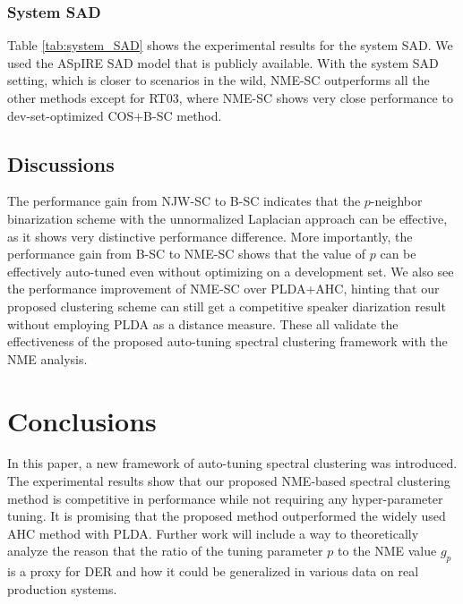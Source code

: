 \documentclass[journal]{IEEEtran}
\begin{document}
\subsubsection{System SAD} Table \ref{tab:system_SAD} shows the experimental results for the system SAD. We used the ASpIRE SAD model \cite{povey2011kaldi} that is publicly available. With the system SAD setting, which is closer to scenarios in the wild, NME-SC outperforms all the other methods except for RT03, where NME-SC shows very close performance to dev-set-optimized COS+B-SC method. 


\vspace{-1ex}
\subsection{Discussions}
The performance gain from NJW-SC to B-SC indicates that the $p$-neighbor binarization scheme with the unnormalized Laplacian approach can be effective, as it shows very distinctive performance difference. More importantly, the performance gain from B-SC to NME-SC shows that the value of $p$ can be effectively auto-tuned even without optimizing on a development set. We also see the performance improvement of NME-SC over PLDA+AHC, hinting that our proposed clustering scheme can still get a competitive speaker diarization result without employing PLDA as a distance measure. These all validate the effectiveness of the proposed auto-tuning spectral clustering framework with the NME analysis. 

\vspace{-1ex}
\section{Conclusions}
In this paper, a new framework of auto-tuning spectral clustering was introduced. The experimental results show that our proposed NME-based spectral clustering method is competitive in performance while not requiring any hyper-parameter tuning. It is promising that the proposed method outperformed the widely used AHC method with PLDA. Further work will include a way to theoretically analyze the reason that the ratio of the tuning parameter $p$ to the NME value $g_p$ is a proxy for DER and how it could be generalized in various data on real production systems. 



\balance
\end{document}
